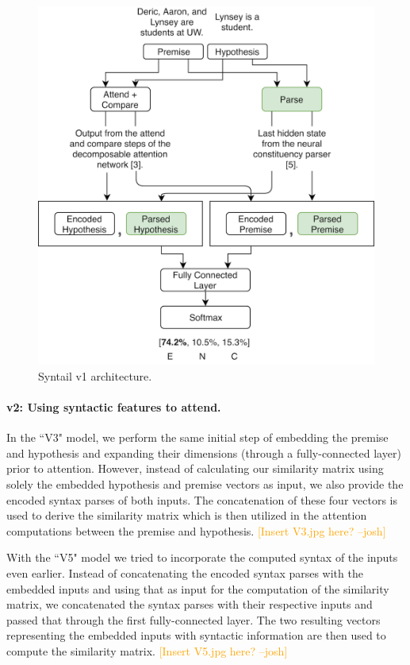\documentclass[11pt,a4paper]{article}
\newcommand{\jbcomment}[1]{\textcolor{orange}{[#1 --josh]}}
\begin{document}
\begin{figure}[h]
    \centering
    \includegraphics[width=\linewidth]{figures/v1.png}
    \caption{Syntail v1 architecture.}
\label{fig:v1}
\end{figure}

\paragraph{v2: Using syntactic features to attend.}
In the ``V3" model, we perform the same initial step of embedding the premise and 
hypothesis and expanding their dimensions (through a fully-connected layer) prior to 
attention. However, instead of calculating our similarity matrix using solely the 
embedded hypothesis and premise vectors as input, we also provide the encoded syntax 
parses of both inputs. The concatenation of these four vectors is used to derive the 
similarity matrix which is then utilized in the attention computations between the 
premise and hypothesis. \jbcomment{Insert V3.jpg here?}

With the ``V5" model we tried to incorporate the computed syntax of the inputs even 
earlier. Instead of concatenating the encoded syntax parses with the embedded inputs 
and using that as input for the computation of the similarity matrix, we concatenated 
the syntax parses with their respective inputs and passed that through the first 
fully-connected layer. The two resulting vectors representing the embedded inputs 
with syntactic information are then used to compute the similarity matrix. \jbcomment{Insert V5.jpg here?}
\end{document}
